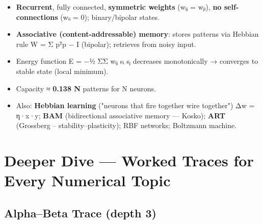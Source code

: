 \begin{itemize}
\tightlist
\item
  \textbf{Recurrent}, fully connected, \textbf{symmetric weights} (wᵢⱼ = wⱼᵢ), \textbf{no self-connections} (wᵢᵢ = 0); binary/bipolar states.
\item
  \textbf{Associative (content-addressable) memory}: stores patterns via Hebbian rule W = Σ pᵀp − I (bipolar); retrieves from noisy input.
\item
  Energy function E = −½ ΣΣ wᵢⱼ sᵢ sⱼ decreases monotonically → converges to stable state (local minimum).
\item
  Capacity ≈ \textbf{0.138 N} patterns for N neurons.
\item
  Also: \textbf{Hebbian learning} ("neurons that fire together wire together") Δw = η·x·y; \textbf{BAM} (bidirectional associative memory --- Kosko); \textbf{ART} (Grossberg -- stability--plasticity); RBF networks; Boltzmann machine.
\end{itemize}

\needspace{131pt}

\hypertarget{p2-10--11-deeper-dive--worked-traces-for-every-numerical-topic}{%
\section{Deeper Dive --- Worked Traces for Every Numerical Topic}\label{p2-10--11-deeper-dive--worked-traces-for-every-numerical-topic}}

\needspace{95pt}

\hypertarget{p2-10--111-alphabeta-trace-depth-3}{%
\subsection{Alpha--Beta Trace (depth 3)}\label{p2-10--111-alphabeta-trace-depth-3}}



\begingroup\small

